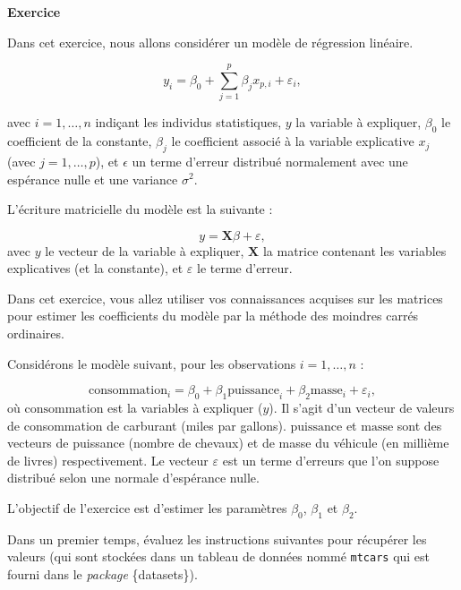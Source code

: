 \documentclass[
  11pt,
]{book}
\newenvironment{Shaded}{\begin{snugshade}}{\end{snugshade}}
\newcommand{\NormalTok}[1]{#1}
\newcommand{\OtherTok}[1]{\textcolor[rgb]{0.56,0.35,0.01}{#1}}
\newcommand{\SpecialCharTok}[1]{\textcolor[rgb]{0.00,0.00,0.00}{#1}}
\numberwithin{equation}{section}
\numberwithin{countremarque}{section}
\newenvironment{greenbox}{
  \begin{tcolorbox}[breakable, colback=vert,coltext=black,
                  colframe=grisfonce]}
 {\end{tcolorbox}}
\begin{document}
\begin{greenbox}

\textbf{Exercice}

Dans cet exercice, nous allons considérer un modèle de régression linéaire.

\[y_i = \beta_0 + \sum_{j=1}^{p} \beta_j x_{p,i} + \varepsilon_i,\]

avec \(i=1,\ldots, n\) indiçant les individus statistiques, \(y\) la variable à expliquer, \(\beta_0\) le coefficient de la constante, \(\beta_j\) le coefficient associé à la variable explicative \(x_j\) (avec \(j=1, \ldots, p\)), et \(\epsilon\) un terme d'erreur distribué normalement avec une espérance nulle et une variance \(\sigma^2\).

L'écriture matricielle du modèle est la suivante :

\[y = \boldsymbol{X} \beta + \varepsilon,\]
avec \(y\) le vecteur de la variable à expliquer, \(\boldsymbol X\) la matrice contenant les variables explicatives (et la constante), et \(\varepsilon\) le terme d'erreur.

Dans cet exercice, vous allez utiliser vos connaissances acquises sur les matrices pour estimer les coefficients du modèle par la méthode des moindres carrés ordinaires.

Considérons le modèle suivant, pour les observations \(i=1,\ldots, n\) :

\[\textrm{consommation}_i = \beta_0 + \beta_1 \textrm{puissance}_i + \beta_2 \textrm{masse}_i + \varepsilon_i,\]
où \(\textrm{consommation}\) est la variables à expliquer (\(y\)). Il s'agit d'un vecteur de valeurs de consommation de carburant (miles par gallons). \(\textrm{puissance}\) et \(\textrm{masse}\) sont des vecteurs de puissance (nombre de chevaux) et de masse du véhicule (en millième de livres) respectivement. Le vecteur \(\varepsilon\) est un terme d'erreurs que l'on suppose distribué selon une normale d'espérance nulle.

L'objectif de l'exercice est d'estimer les paramètres \(\beta_0\), \(\beta_1\) et \(\beta_2\).

Dans un premier temps, évaluez les instructions suivantes pour récupérer les valeurs (qui sont stockées dans un tableau de données nommé \texttt{mtcars} qui est fourni dans le \emph{package} \{datasets\}).

\begin{Shaded}
\end{Shaded}


\end{greenbox}
\end{document}

